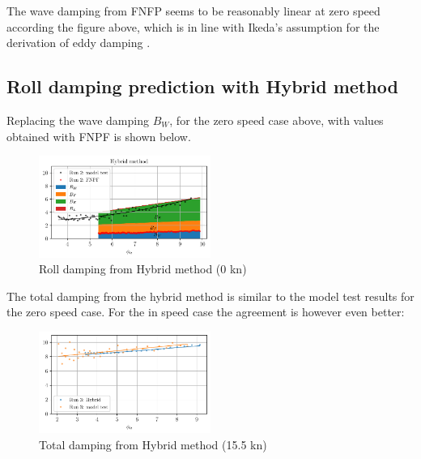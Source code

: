     The wave damping from FNFP seems to be reasonably linear at zero speed
according the figure above, which is in line with Ikeda's assumption for
the derivation of eddy damping \cite{7505983/4AFVVGNT}.

    \subsection{Roll damping prediction with Hybrid
method}\label{roll-damping-prediction-with-hybrid-method}
Replacing the wave damping $B_W$, for the zero speed case above, with values obtained with FNPF is shown below. 
    \begin{figure}[H]
        \begin{center}\includegraphics[width = 0.5\textwidth]{figures/hybrid_0.pdf}\end{center}
        \vspace{-1cm}
        \caption{Roll damping from Hybrid method (0 kn)}
        \label{fig:hybrid_0}
    \end{figure}
    
    The total damping from the hybrid method is similar to the model test
results for the zero speed case. For the in speed case the agreement is
however even better:

    \begin{figure}[H]
        \begin{center}\includegraphics[width = 0.5\textwidth]{figures/hybrid_speed_amplitudes.pdf}\end{center}
        \vspace{-1cm}
        \caption{Total damping from Hybrid method (15.5 kn)}
        \label{fig:hybrid_speed_amplitudes}
    \end{figure}
    
